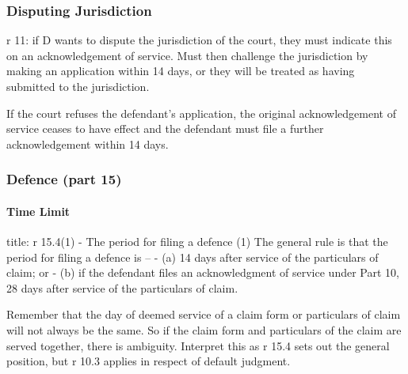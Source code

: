\documentclass[
]{article}
\newenvironment{Shaded}{}{}
\newcommand{\NormalTok}[1]{#1}
\begin{document}
\hypertarget{disputing-jurisdiction}{%
\subsubsection{Disputing Jurisdiction}\label{disputing-jurisdiction}}

r 11: if D wants to dispute the jurisdiction of the court, they must
indicate this on an acknowledgement of service. Must then challenge the
jurisdiction by making an application within 14 days, or they will be
treated as having submitted to the jurisdiction.

If the court refuses the defendant's application, the original
acknowledgement of service ceases to have effect and the defendant must
file a further acknowledgement within 14 days.

\hypertarget{defence-part-15}{%
\subsubsection{Defence (part 15)}\label{defence-part-15}}

\hypertarget{time-limit}{%
\paragraph{Time Limit}\label{time-limit}}

\begin{Shaded}
\begin{Highlighting}[]
\NormalTok{title: r 15.4(1) {-} The period for filing a defence}
\NormalTok{(1) The general rule is that the period for filing a defence is –}
\NormalTok{{-} (a) 14 days after service of the particulars of claim; or}
\NormalTok{{-} (b) if the defendant files an acknowledgment of service under Part 10, 28 days after service of the particulars of claim.}
\end{Highlighting}
\end{Shaded}

\begin{Shaded}
\begin{Highlighting}[]
\NormalTok{Remember that the day of deemed service of a claim form or particulars of claim will not always be the same. So if the claim form and particulars of the claim are served together, there is ambiguity. Interpret this as r 15.4 sets out the general position, but r 10.3 applies in respect of default judgment.}
\end{Highlighting}
\end{Shaded}
\end{document}
